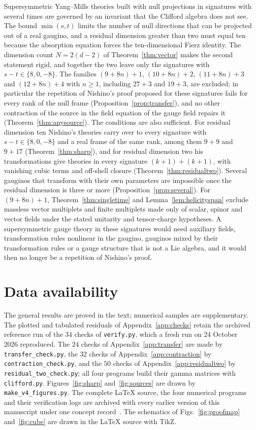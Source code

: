 Supersymmetric Yang--Mills theories built with null projections in signatures with several times are governed by an invariant that the Clifford algebra does not see. The bound $\min(s,t)$ limits the number of null directions that can be projected out of a real gaugino, and a residual dimension greater than two must equal ten because the absorption equation forces the ten-dimensional Fierz identity. The dimension count $N=2(d-2)$ of Theorem~\ref{thm:vector} makes the second statement rigid, and together the two leave only the signatures with $s-t\in\{8,0,-8\}$. The families $(9+8n)+1$, $(10+8n)+2$, $(11+8n)+3$ and $(12+8n)+4$ with $n\ge1$, including $27+3$ and $19+3$, are excluded; in particular the repetition of Nishino's proof proposed for these signatures fails for every rank of the null frame (Proposition~\ref{prop:transfer}), and no other contraction of the source in the field equation of the gauge field repairs it (Theorem~\ref{thm:anysource}). The conditions are also sufficient. For residual dimension ten Nishino's theories carry over to every signature with $s-t\in\{8,0,-8\}$ and a real frame of the same rank, among them $9+9$ and $9+17$ (Theorem~\ref{thm:sharp}), and for residual dimension two his transformations give theories in every signature $(k+1)+(k+1)$, with vanishing cubic terms and off-shell closure (Theorem~\ref{thm:residualtwo}). Several gauginos that transform with their own parameters are impossible once the residual dimension is three or more (Proposition~\ref{prop:several}). For $(9+8n)+1$, Theorem~\ref{thm:singletime} and Lemma~\ref{lem:helicityspan} exclude massless vector multiplets and finite multiplets made only of scalar, spinor and vector fields under the stated unitarity and tensor-charge hypotheses. A supersymmetric gauge theory in these signatures would need auxiliary fields, transformation rules nonlinear in the gaugino, gauginos mixed by their transformation rules or a gauge structure that is not a Lie algebra, and it would then no longer be a repetition of Nishino's proof.

\section*{Data availability}

The general results are proved in the text; numerical samples are supplementary. The plotted and tabulated residuals of Appendix~\ref{app:checks} retain the archived reference run of the $34$ checks of \texttt{verify.py}, which a fresh run on 24 October 2026 reproduced. The $24$ checks of Appendix~\ref{app:transfer} are made by \texttt{transfer\_check.py}, the $32$ checks of Appendix~\ref{app:contraction} by \texttt{contraction\_check.py}, and the $50$ checks of Appendix~\ref{app:residualtwo} by \texttt{residual\_two\_check.py}; all four programs build their gamma matrices with \texttt{clifford.py}. Figures~\ref{fig:sharp} and~\ref{fig:sources} are drawn by \texttt{make\_v4\_figures.py}. The complete \LaTeX{} source, the four numerical programs and their verification logs are archived with every earlier version of this manuscript under one concept record~\cite{Paper4Release}. The schematics of Figs.~\ref{fig:proofmap} and~\ref{fig:cube} are drawn in the \LaTeX{} source with TikZ.

